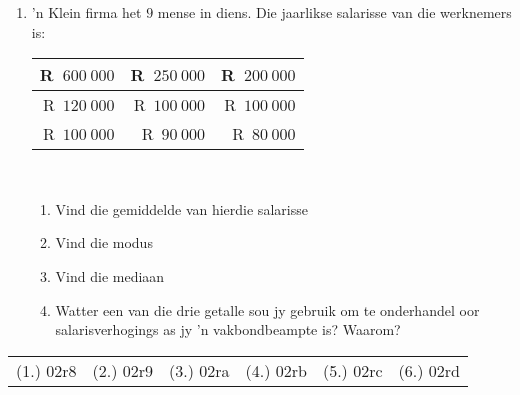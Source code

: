 \begin{eocexercises}{}
\begin{enumerate}[itemsep=6pt, label=\textbf{\arabic*}.]
  \item ’n Klein firma het $9$ mense in diens. Die jaarlikse salarisse van die werknemers is:\\
    \begin{center}
      \begin{tabular}{|r|r|r|} \hline
        R~$600~000$ & R~$250~000$ & R~$200~000$ \\\hline
        R~$120~000$ & R~$100~000$ & R~$100~000$ \\\hline
        R~$100~000$ &  R~$90~000$ &  R~$80~000$ \\\hline
      \end{tabular}
    \end{center}
\vspace {8pt}\\
    \begin{enumerate}[noitemsep, label=\textbf{(\alph*)} ]
    \item Vind die gemiddelde van hierdie salarisse
    \item Vind die modus
    \item Vind die mediaan
    \item Watter een van die drie getalle sou jy gebruik om te onderhandel oor salarisverhogings as jy ’n vakbondbeampte is? Waarom?
    \end{enumerate}

  \end{enumerate}
\par \practiceinfo
\par \begin{tabular}[h]{cccccc}
(1.)	02r8	&
(2.)	02r9	&
(3.)	02ra	&
(4.)	02rb	&
(5.)	02rc	&
(6.)	02rd	\\ %
\end{tabular}
\end{eocexercises}
